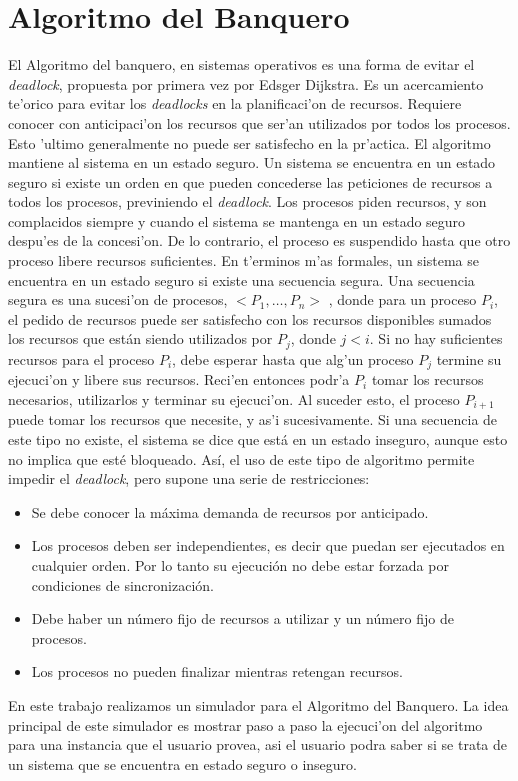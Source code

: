 \section{Algoritmo del Banquero}
El Algoritmo del banquero, en sistemas operativos es una forma de evitar el \emph{deadlock}, propuesta por primera vez por Edsger Dijkstra. Es un acercamiento te'orico para evitar los \emph{deadlocks} en la planificaci'on de recursos. Requiere conocer con anticipaci'on los recursos que ser'an utilizados por todos los procesos. Esto 'ultimo generalmente no puede ser satisfecho en la pr'actica.
El algoritmo mantiene al sistema en un estado seguro. Un sistema se encuentra en un estado seguro si existe un orden en que pueden concederse las peticiones de recursos a todos los procesos, previniendo el \emph{deadlock}.
Los procesos piden recursos, y son complacidos siempre y cuando el sistema se mantenga en un estado seguro despu'es de la concesi'on. De lo contrario, el proceso es suspendido hasta que otro proceso libere recursos suficientes.
En t'erminos m'as formales, un sistema se encuentra en un estado seguro si existe una secuencia segura. Una secuencia segura es una sucesi'on de procesos, $< P_1,\ldots, P_n >$ , donde para un proceso $P_i$, el pedido de recursos puede ser satisfecho con los recursos disponibles sumados los recursos que están siendo utilizados por $P_j$, donde $j < i$. Si no hay suficientes recursos para el proceso $P_i$, debe esperar hasta que alg'un proceso $P_j$ termine su ejecuci'on y libere sus recursos. Reci'en entonces podr'a $P_i$ tomar los recursos necesarios, utilizarlos y terminar su ejecuci'on. Al suceder esto, el proceso $P_{i+1}$ puede tomar los recursos que necesite, y as'i sucesivamente. Si una secuencia de este tipo no existe, el sistema se dice que está en un estado inseguro, aunque esto no implica que esté bloqueado.
Así, el uso de este tipo de algoritmo permite impedir el \emph{deadlock}, pero supone una serie de restricciones:
\begin{itemize}
 \item Se debe conocer la máxima demanda de recursos por anticipado.
 \item Los procesos deben ser independientes, es decir que puedan ser ejecutados en cualquier orden. Por lo tanto su ejecución no debe estar forzada por condiciones de sincronización.
 \item Debe haber un número fijo de recursos a utilizar y un número fijo de procesos.
 \item Los procesos no pueden finalizar mientras retengan recursos.
\end{itemize}
En este trabajo realizamos un simulador para el Algoritmo del Banquero. La idea principal de este simulador es mostrar paso a paso la ejecuci'on del algoritmo para una instancia que el usuario provea, asi el usuario podra saber si se trata de un sistema que se encuentra en estado seguro o inseguro.